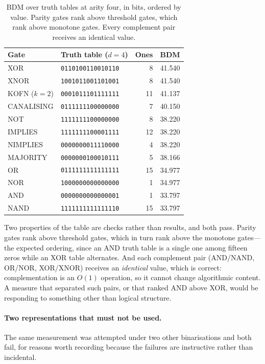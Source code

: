 \documentclass[11pt]{article}
\begin{document}
\begin{table}[h]
\centering
\small
\begin{tabular}{@{}llrr@{}}
\toprule
\textbf{Gate} & \textbf{Truth table ($d=4$)} & \textbf{Ones} & \textbf{BDM} \\
\midrule
XOR        & \texttt{0110100110010110} & 8  & 41.540 \\
XNOR       & \texttt{1001011001101001} & 8  & 41.540 \\
KOFN ($k{=}2$) & \texttt{0001011101111111} & 11 & 41.137 \\
CANALISING & \texttt{0111111100000000} & 7  & 40.150 \\
NOT        & \texttt{1111111100000000} & 8  & 38.220 \\
IMPLIES    & \texttt{1111111100001111} & 12 & 38.220 \\
NIMPLIES   & \texttt{0000000011110000} & 4  & 38.220 \\
MAJORITY   & \texttt{0000000100010111} & 5  & 38.166 \\
OR         & \texttt{0111111111111111} & 15 & 34.977 \\
NOR        & \texttt{1000000000000000} & 1  & 34.977 \\
AND        & \texttt{0000000000000001} & 1  & 33.797 \\
NAND       & \texttt{1111111111111110} & 15 & 33.797 \\
\bottomrule
\end{tabular}
\caption{BDM over truth tables at arity four, in bits, ordered by value.
Parity gates rank above threshold gates, which rank above monotone gates.
Every complement pair receives an identical value.}
\label{tab:gate-bdm}
\end{table}

Two properties of the table are checks rather than results, and both pass.
Parity gates rank above threshold gates, which in turn rank above the monotone
gates---the expected ordering, since an AND truth table is a single one among
fifteen zeros while an XOR table alternates.  And each complement pair
(AND/NAND, OR/NOR, XOR/XNOR) receives an \emph{identical} value, which is
correct: complementation is an $O(1)$ operation, so it cannot change
algorithmic content.  A measure that separated such pairs, or that ranked AND
above XOR, would be responding to something other than logical structure.

\paragraph{Two representations that must not be used.}
The same measurement was attempted under two other binarisations and both fail,
for reasons worth recording because the failures are instructive rather than
incidental.
\end{document}
